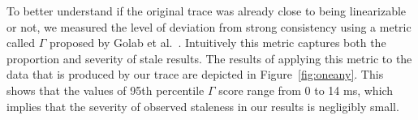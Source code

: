 \documentclass[conference]{IEEEtran}
\begin{document}
	To better understand if the original trace was already close to being linearizable or not, we measured the level of deviation from strong consistency using a metric called $\Gamma$ proposed by Golab et al.~\cite{DBLP:conf/cloud/GolabRAKWG13}. Intuitively this
	metric captures both the proportion and severity of stale results. The results of applying this metric to the data that is produced by our trace are depicted in Figure~\ref{fig:oneany}. This shows that the values of 95th percentile 
	$\Gamma$ score range from 0 to 14 ms, which implies that the severity of observed staleness in our results is negligibly small.
	
\end{document}
